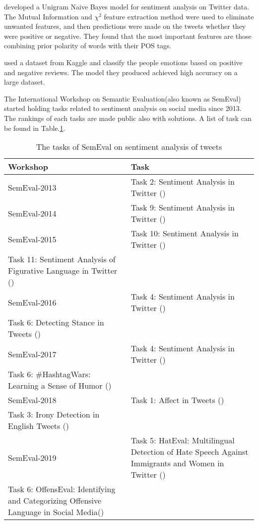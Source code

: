 \cite{opinionMiningLiang2013} developed a Unigram Naive Bayes model for
sentiment analysis on Twitter data. The Mutual Information and $\chi^2$ feature
extraction method were used to eliminate unwanted features, and then predictions
were made on the tweets whether they were positive or negative. They found that
the most important features are those combining prior polarity of words with
their POS tags.

\cite{bhavsar2019sentiment} used a dataset from Kaggle and classify the people
emotions based on positive and negative reviews. The model they produced achieved
high accuracy on a large dataset.

The International Workshop on Semantic Evaluation(also known as SemEval)
started holding tasks related to sentiment analysis on social media since 2013.
The rankings of each tasks are made public also with solutions. A list of task
can be found in Table.\ref{table:SemEvalTasks}. %


\begin{table}[h]
  \caption{The tasks of SemEval on sentiment analysis of tweets}
  \label{table:SemEvalTasks}
  \centering
  \renewcommand{\tabularxcolumn}{m} %
  \begin{tabularx}{\textwidth}{l >{\raggedright}X}
    \toprule
    \textbf{Workshop} & \textbf{Task}
    \tabularnewline \midrule
    SemEval-2013
    &
    Task 2: Sentiment Analysis in Twitter (\cite{SemEval2013Task2})
    \tabularnewline \hline
    SemEval-2014
    &
    Task 9: Sentiment Analysis in Twitter (\cite{SemEval2014Task9})
    \tabularnewline \hline
    SemEval-2015
    &
    Task 10: Sentiment Analysis in Twitter (\cite{SemEval2015Task10})\\
    Task 11: Sentiment Analysis of Figurative Language in Twitter
    (\cite{SemEval2015Task11})
    \tabularnewline \hline
    SemEval-2016
    &
    Task 4: Sentiment Analysis in Twitter (\cite{SemEval2016Task4})\\
    Task 6: Detecting Stance in Tweets (\cite{SemEval2016Task6})
    \tabularnewline \hline
    SemEval-2017
    &
    Task 4: Sentiment Analysis in Twitter (\cite{SemEval2017Task4})\\
    Task 6: \#HashtagWars: Learning a Sense of Humor (\cite{SemEval2017Task6})
    \tabularnewline \hline
    SemEval-2018
    &
    Task 1: Affect in Tweets (\cite{SemEval2018Task1})\\
    Task 3: Irony Detection in English Tweets (\cite{SemEval2018Task3})
    \tabularnewline \hline
    SemEval-2019
    &
    Task 5: HatEval: Multilingual Detection of Hate Speech Against Immigrants
    and Women in Twitter (\cite{SemEval2019Task5})\\
    Task 6: OffensEval: Identifying and Categorizing Offensive Language in
    Social Media(\cite{SemEval2019Task6})
    \tabularnewline \bottomrule
  \end{tabularx}
\end{table}
